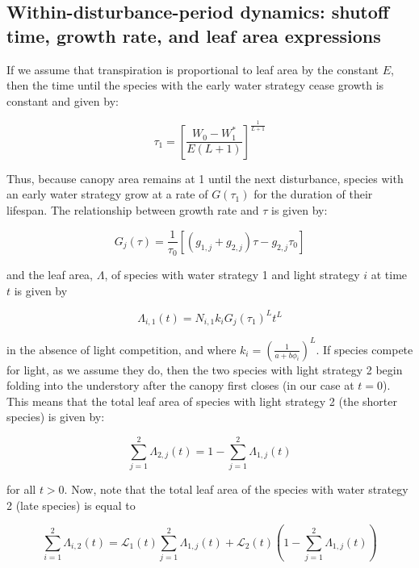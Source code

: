 \documentclass[11pt]{article}
\begin{document}
\subsection{Within-disturbance-period dynamics: shutoff time, growth rate, and leaf area expressions}
\label{sec:orgd3893c2}

If we assume that transpiration is proportional to leaf area by the constant \(E\), then the time until the species with the early water strategy cease growth is constant and given by:

\begin{equation}
    \tau_1 = \left[\frac{W_0 - W_1^*}{E (L+1)}\right]^{\frac{1}{L+1}}
\end{equation}

Thus, because canopy area remains at 1 until the next disturbance, species with an early water strategy grow at a rate of \(G(\tau_1)\) for the duration of their lifespan. The relationship between growth rate and \(\tau\) is given by:

\begin{equation}
    G_j(\tau) = \frac{1}{\tau_0}\left[ (g_{1,j} + g_{2,j}) \tau - g_{2,j} \tau_0 \right]
\end{equation}

and the leaf area, \(\Lambda\), of species with water strategy 1 and light strategy \(i\) at time \(t\) is given by

\begin{equation}
    \Lambda_{i,1}(t) = N_{i,1} k_i G_j(\tau_1)^L t^L
\end{equation}

in the absence of light competition, and where \(k_i = \left(\frac{1}{a + b \phi_i}\right)^L\). If species compete for light, as we assume they do, then the two species with light strategy 2 begin folding into the understory after the canopy first closes (in our case at \(t=0\)). This means that the total leaf area of species with light strategy 2 (the shorter species) is given by:

\begin{equation}
    \sum_{j=1}^2 \Lambda_{2,j}(t) = 1 - \sum_{j=1}^2 \Lambda_{1,j}(t)
\end{equation}

for all \(t > 0\). Now, note that the total leaf area of the species with water strategy 2 (late species) is equal to

\begin{equation}
    \sum_{i=1}^2 \Lambda_{i,2}(t) = \mathcal{L}_1(t) \sum_{j=1}^2 \Lambda_{1,j}(t) + \mathcal{L}_2(t) (1 - \sum_{j=1}^2 \Lambda_{1,j}(t))
\end{equation}
\end{document}

